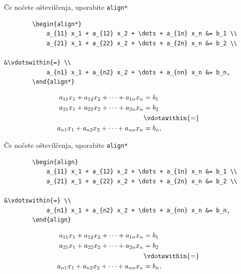 \documentclass{beamer}
\begin{document}
\begin{frame}[fragile]{Če nočete oštevilčenja, uporabite \texttt{align*}}
    \begin{dobroenv}
    \begin{verbatim}
        \begin{align*}
            a_{11} x_1 + a_{12} x_2 + \dots + a_{1n} x_n &= b_1 \\
            a_{21} x_1 + a_{22} x_2 + \dots + a_{2n} x_n &= b_2 \\
                                                         &\vdotswithin{=} \\
            a_{n1} x_1 + a_{n2} x_2 + \dots + a_{nn} x_n &= b_n,
        \end{align*}
        \end{verbatim}

    \begin{align*}
        a_{11} x_1 + a_{12} x_2 + \dots + a_{1n} x_n &= b_1 \\
        a_{21} x_1 + a_{22} x_2 + \dots + a_{2n} x_n &= b_2 \\
                                                     &\vdotswithin{=} \\
        a_{n1} x_1 + a_{n2} x_2 + \dots + a_{nn} x_n &= b_n,
    \end{align*}
    \end{dobroenv}
\end{frame}

\begin{frame}[fragile]{Če nočete oštevilčenja, uporabite \texttt{align*}}
    \begin{slaboenv}
    \begin{verbatim}
        \begin{align}
            a_{11} x_1 + a_{12} x_2 + \dots + a_{1n} x_n &= b_1 \\
            a_{21} x_1 + a_{22} x_2 + \dots + a_{2n} x_n &= b_2 \\
                                                         &\vdotswithin{=} \\
            a_{n1} x_1 + a_{n2} x_2 + \dots + a_{nn} x_n &= b_n,
        \end{align}
        \end{verbatim}

    \begin{align}
        a_{11} x_1 + a_{12} x_2 + \dots + a_{1n} x_n &= b_1 \\
        a_{21} x_1 + a_{22} x_2 + \dots + a_{2n} x_n &= b_2 \\
                                                     &\vdotswithin{=} \\
        a_{n1} x_1 + a_{n2} x_2 + \dots + a_{nn} x_n &= b_n,
    \end{align}
    \end{slaboenv}
\end{frame}
\end{document}
